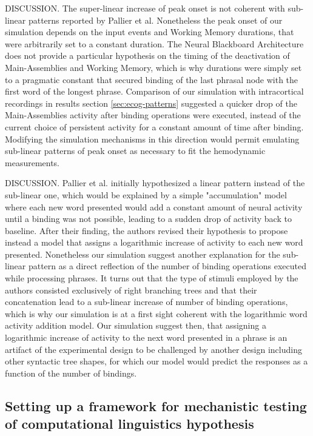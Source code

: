 \documentclass[10pt]{article}
\begin{document}
DISCUSSION. The super-linear increase of peak onset is not coherent with sub-linear patterns reported by Pallier et al.
Nonetheless the peak onset of our simulation depends on the input events and Working Memory durations, that were arbitrarily set to a constant duration.
The Neural Blackboard Architecture does not provide a particular hypothesis on the timing of the deactivation of Main-Assemblies and Working Memory, which is why durations were simply set to a pragmatic constant that secured binding of the last phrasal node with the first word of the longest phrase.
Comparison of our simulation with intracortical recordings in results section \ref{sec:ecog-patterns} suggested a quicker drop of the Main-Assemblies activity after binding operations were executed, instead of the current choice of persistent activity for a constant amount of time after binding.
Modifying the simulation mechanisms in this direction would permit emulating sub-linear patterns of peak onset as necessary to fit the hemodynamic measurements.


DISCUSSION. Pallier et al. initially hypothesized a linear pattern instead of the sub-linear one, which would be explained by a simple "accumulation" model where each new word presented would add a constant amount of neural activity until a binding was not possible, leading to a sudden drop of activity back to baseline.
After their finding, the authors revised their hypothesis to propose instead a model that assigns a logarithmic increase of activity to each new word presented.
Nonetheless our simulation suggest another explanation for the sub-linear pattern as a direct reflection of the number of binding operations executed while processing phrases.
It turns out that the type of stimuli employed by the authors consisted exclusively of right branching trees and that their concatenation lead to a sub-linear increase of number of binding operations, which is why our simulation is at a first sight coherent with the logarithmic word activity addition model.
Our simulation suggest then, that assigning a logarithmic increase of activity to the next word presented in a phrase is an artifact of the experimental design to be challenged by another design including other syntactic tree shapes, for which our model would predict the responses as a function of the number of bindings.




\subsection{Setting up a framework for mechanistic testing of computational linguistics hypothesis}
\end{document}
